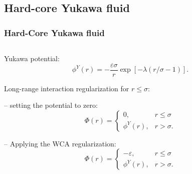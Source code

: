\documentclass[8pt]{beamer}
\begin{document}
	\subsection{Hard-core Yukawa fluid}
	
	\begin{frame}
		\frametitle{Hard-Core Yukawa fluid}
		
		\begin{columns}
			\begin{column}{0.5\textwidth}
				Yukawa potential:
				\begin{equation*}
					\label{def:yukawa}
					\phi^Y(r) = -\frac{\varepsilon \sigma}{r} \exp[-\lambda(r/\sigma - 1)].
				\end{equation*}
				
				Long-range interaction regularization for $r \leq \sigma$:
				\hfill
				\\
				\hfill
				
				-- setting the potential to zero:
				\begin{equation*}
					\Phi(r) = \left\{
					\begin{array}{ll}
						0, & r \leq \sigma 
						\\
						\phi^Y(r), & r > \sigma.
					\end{array}
					\right.
				\end{equation*}
				
				-- Applying the WCA regularization:
				\begin{equation*}
					\Phi(r) = \left\{
					\begin{array}{ll}
						-\varepsilon, & r \leq \sigma 
						\\
						\phi^Y(r), & r > \sigma.
					\end{array}
					\right.
				\end{equation*}
			\end{column}
			

\end{columns}
\end{frame}
\end{document}

